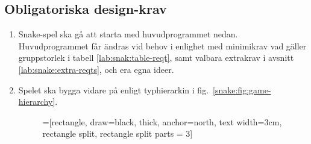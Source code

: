 \subsection{Obligatoriska design-krav}

\begin{enumerate}[label={$\square$}, leftmargin=*]

\item Snake-spel ska gå att starta med huvudprogrammet nedan. Huvudprogrammet får ändras vid behov i enlighet med minimikrav vad gäller gruppstorlek i tabell \ref{lab:snak:table-reqt}, samt valbara extrakrav i avsnitt \ref{lab:snake:extra-reqts}, och era egna ideer.

\item Spelet ska bygga vidare på  enligt typhierarkin i fig.~\ref{snake:fig:game-hierarchy}.

\begin{figure}[H]
\begin{center}
\newcommand{\TextBox}[1]{\raisebox{0pt}[1em][0.5em]{#1}}
=[rectangle, draw=black,  thick, anchor=north, text width=3cm, rectangle split, rectangle split parts = 3]
\end{center}
\end{figure}
\end{enumerate}
